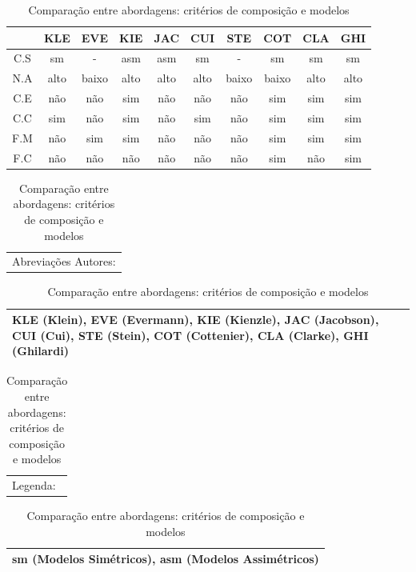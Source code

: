 \begin{table}[h]
	\centering
	\begin{tabular}{ | c | c | c | c | c | c | c | c | c | c | }
		\hline
		 & KLE & EVE & KIE & JAC & CUI & STE & COT & CLA & GHI \\
		\hline
		 C.S & sm & - & asm & asm & sm & - & sm & sm & sm \\
		\hline
		 N.A & alto & baixo & alto & alto & alto & baixo & baixo & alto & alto \\
		\hline
		 C.E & não & não & sim & não & não & não & sim & sim & sim \\
		\hline
		 C.C & sim & não & sim & não & sim & não & sim & sim & sim \\
		\hline
		 F.M & não & sim & sim & não & não & não & sim & sim & sim \\
		\hline
		 F.C & não & não & não & não & não & não & sim & não & sim  \\
		\hline
	\end{tabular}
	
	\hspace{2em}

	\begin{tabular}{  p{12cm}  }
		Abreviações Autores: \\
	\end{tabular}
	
	\begin{tabular}{ | p{12cm} | }
		\hline
		KLE (Klein), EVE (Evermann), KIE (Kienzle), JAC (Jacobson), CUI (Cui), STE (Stein), COT (Cottenier), CLA (Clarke), GHI (Ghilardi) \\
		\hline
	\end{tabular}

	\begin{tabular}{  p{12cm}  }
		Legenda: \\
	\end{tabular}

	\begin{tabular}{ | p{12cm} | }
		\hline
		sm (Modelos Simétricos), asm (Modelos Assimétricos) \\
		\hline
	\end{tabular}
	\caption{Comparação entre abordagens: critérios de composição e modelos}
	\label{tab:comparison_table_models}
\end{table} 

